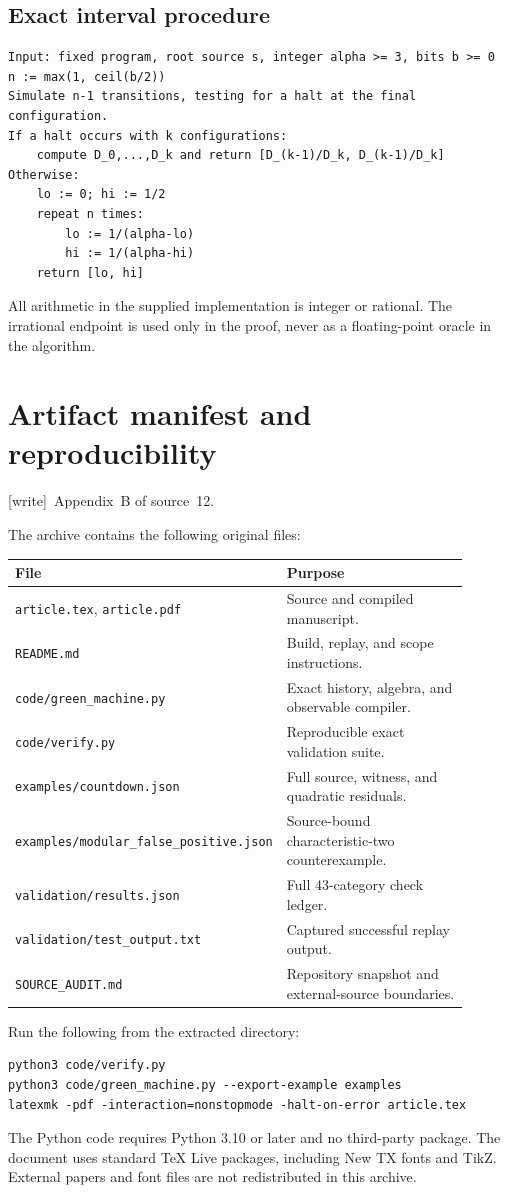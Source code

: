 \documentclass[11pt,letterpaper]{article}
\theoremstyle{definition}
\theoremstyle{remark}
\newcommand{\wtag}{\textup{[write]}}
\begin{document}
\subsection{Exact interval procedure}
\begin{lstlisting}
Input: fixed program, root source s, integer alpha >= 3, bits b >= 0
n := max(1, ceil(b/2))
Simulate n-1 transitions, testing for a halt at the final configuration.
If a halt occurs with k configurations:
    compute D_0,...,D_k and return [D_(k-1)/D_k, D_(k-1)/D_k]
Otherwise:
    lo := 0; hi := 1/2
    repeat n times:
        lo := 1/(alpha-lo)
        hi := 1/(alpha-hi)
    return [lo, hi]
\end{lstlisting}
All arithmetic in the supplied implementation is integer or rational.
The irrational endpoint is used only in the proof, never as a
floating-point oracle in the algorithm.

\section{Artifact manifest and reproducibility}\label{ste:cg:app:manifest}

\noindent\wtag\ Appendix~B of source~12.

The archive contains the following original files:
\begin{center}
\begin{tabular}{p{0.40\linewidth}p{0.50\linewidth}}
\toprule
File & Purpose\\
\midrule
\texttt{article.tex}, \texttt{article.pdf} & Source and compiled manuscript.\\
\texttt{README.md} & Build, replay, and scope instructions.\\
\texttt{code/green\_machine.py} & Exact history, algebra, and observable compiler.\\
\texttt{code/verify.py} & Reproducible exact validation suite.\\
\texttt{examples/countdown.json} & Full source, witness, and quadratic residuals.\\
\texttt{examples/}\newline\texttt{modular\_false\_positive.json} & Source-bound characteristic-two counterexample.\\
\texttt{validation/results.json} & Full 43-category check ledger.\\
\texttt{validation/test\_output.txt} & Captured successful replay output.\\
\texttt{SOURCE\_AUDIT.md} & Repository snapshot and external-source boundaries.\\
\bottomrule
\end{tabular}
\end{center}
Run the following from the extracted directory:
\begin{lstlisting}
python3 code/verify.py
python3 code/green_machine.py --export-example examples
latexmk -pdf -interaction=nonstopmode -halt-on-error article.tex
\end{lstlisting}
The Python code requires Python 3.10 or later and no third-party package.
The document uses standard TeX Live packages, including New TX fonts and
TikZ. External papers and font files are not redistributed in this archive.
\end{document}
